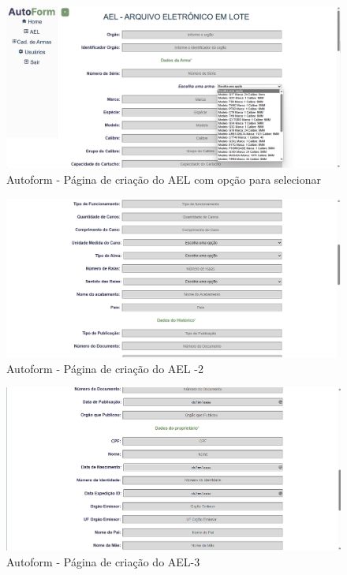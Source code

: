 \begin{figure}[H]
    \caption{\label{fig:tela-ael-selecao}Autoform - Página de criação do AEL com opção para selecionar}
    \begin{center}
        \includegraphics[scale=0.3]{imagens/autoform-ael-selecao.png}
    \end{center}
\end{figure}

\begin{figure}[H]
    \caption{\label{fig:tela-ael2}Autoform - Página de criação do AEL -2}
    \begin{center}
        \includegraphics[scale=0.5]{imagens/autoform-ael-gerar2.png}
    \end{center}
\end{figure}
\begin{figure}[H]
    \caption{\label{fig:tela-ael3}Autoform - Página de criação do AEL-3}
    \begin{center}
        \includegraphics[scale=0.5]{imagens/autoform-ael-gerar3.png}
    \end{center}
\end{figure}

